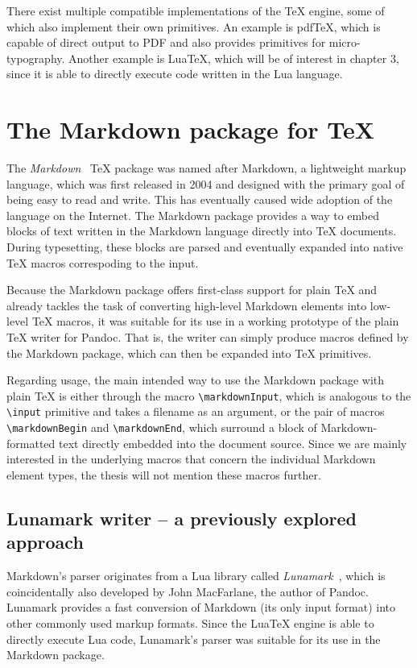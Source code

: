 \documentclass[
  digital,     %
  oneside,     %
  nosansbold,  %
  nocolorbold, %
  lof,         %
  lot,         %
]{fithesis4}
\newcommand\macro[1]{\texttt{\textbackslash{}{#1}}}
\begin{document}
There exist multiple compatible implementations of the \TeX{} engine, some of which also implement their own primitives. An example is pdf\TeX{}, which is capable of direct output to PDF and also provides primitives for micro-typography. Another example is Lua\TeX{}, which will be of interest in chapter 3, since it is able to directly execute code written in the Lua language.

\section{The Markdown package for \TeX{}}
The \emph{Markdown}~\cite{cstug-markdown} \TeX{} package was named after Markdown, a lightweight markup language, which was first released in 2004 and designed with the primary goal of being easy to read and write. This has eventually caused wide adoption of the language on the Internet. The Markdown package provides a way to embed blocks of text written in the Markdown language directly into \TeX{} documents. During typesetting, these blocks are parsed and eventually expanded into native \TeX{} macros correspoding to the input. 

Because the Markdown package offers first-class support for plain \TeX{} and already tackles the task of converting high-level Markdown elements into low-level \TeX{} macros, it was suitable for its use in a working prototype of the plain \TeX{} writer for Pandoc. That is, the writer can simply produce macros defined by the Markdown package, which can then be expanded into \TeX{} primitives.

Regarding usage, the main intended way to use the Markdown package with plain \TeX{} is either through the macro \macro{markdownInput}, which is analogous to the \macro{input} primitive and takes a filename as an argument, or the pair of macros \macro{markdownBegin} and \macro{markdownEnd}, which surround a block of Markdown-formatted text directly embedded into the document source. Since we are mainly interested in the underlying macros that concern the individual Markdown element types, the thesis will not mention these macros further.

\subsection{Lunamark writer -- a previously explored approach}
Markdown's parser originates from a Lua library called \emph{Lunamark}~\cite{lunamark}, which is coincidentally also developed by John MacFarlane, the author of Pandoc. Lunamark provides a fast conversion of Markdown (its only input format) into other commonly used markup formats. Since the Lua\TeX{} engine is able to directly execute Lua code, Lunamark's parser was suitable for its use in the Markdown package.
\end{document}
